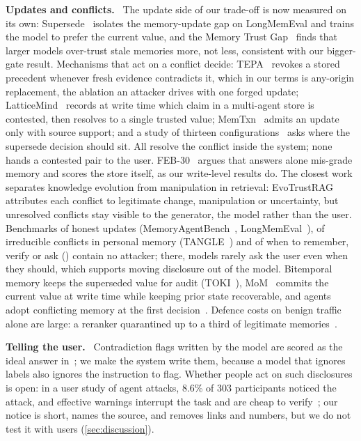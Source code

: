 \documentclass[letterpaper,twocolumn,10pt]{article}
\newcommand{\para}[1]{\smallskip\noindent\textbf{#1}\ }
\begin{document}
\para{Updates and conflicts.} The update side of our trade-off is now measured on its own:
Supersede~\cite{supersede} isolates the memory-update gap on LongMemEval and trains the model to
prefer the current value, and the Memory Trust Gap~\cite{trustgap} finds that larger models
over-trust stale memories more, not less, consistent with our bigger-gate result. Mechanisms
that act on a conflict decide: TEPA~\cite{tepa} revokes a stored precedent whenever fresh
evidence contradicts it, which in our terms is any-origin replacement, the ablation an attacker
drives with one forged update; LatticeMind~\cite{latticemind} records at write
time which claim in a multi-agent store is contested, then resolves to a single trusted value;
MemTxn~\cite{memtxn} admits an update only with source support; and a study of thirteen
configurations~\cite{controlplane} asks where the supersede decision should sit. All resolve the
conflict inside the system; none hands a contested pair to the user. FEB-30~\cite{feb30} argues
that answers alone mis-grade memory and scores the store itself, as our write-level results do.
The closest work separates knowledge evolution from manipulation
in retrieval: EvoTrustRAG~\cite{evotrustrag} attributes each conflict to legitimate change,
manipulation or uncertainty, but unresolved conflicts stay visible to the generator, the model
rather than the user. Benchmarks of honest updates (MemoryAgentBench~\cite{memoryagentbench},
LongMemEval~\cite{longmemeval}), of irreducible conflicts in personal memory
(TANGLE~\cite{tangle}) and of when to remember, verify or ask (\cite{rva}) contain no attacker;
there, models rarely ask the user even when they should, which supports moving disclosure out
of the model. Bitemporal memory keeps the superseded value for audit (TOKI~\cite{toki}), MoM~\cite{mom}
commits the current value at write time while keeping prior state recoverable, and
agents adopt conflicting memory at the first decision~\cite{compliancetrap}. Defence costs on
benign traffic alone are large: a reranker quarantined up to a third of legitimate
memories~\cite{priceofsafety}.

\para{Telling the user.} Contradiction flags written by the model are scored as the ideal
answer in~\cite{archmatters}; we make the system write them, because a model that ignores labels
also ignores the instruction to flag. Whether people act on such disclosures is open: in a user
study of agent attacks, 8.6\% of 303 participants noticed the attack, and effective warnings
interrupt the task and are cheap to verify~\cite{aresure}; our notice is short, names the source,
and removes links and numbers, but we do not test it with users (\cref{sec:discussion}).
\end{document}
